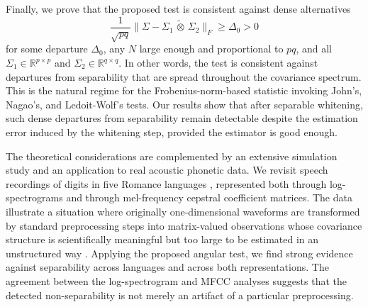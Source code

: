 \documentclass[12pt]{article}
\newcommand{\R}{\mathbb{R}}
\newcommand{\ot}{\,\tilde\otimes\,}
\begin{document}
Finally, we prove that the proposed test is consistent against dense alternatives
\[
\frac{1}{\sqrt{pq}}\| \Sigma - \Sigma_1 \ot \Sigma_2\|_F \geq \Delta_0 > 0
\]
for some departure $\Delta_0$, any $N$ large enough and proportional to $pq$, and all $\Sigma_1 \in \R^{p \times p}$ and $\Sigma_2 \in \R^{q \times q}$.
In other words, the test is consistent against departures from separability that are spread throughout the covariance spectrum. This is the natural regime for the Frobenius-norm-based statistic invoking John's, Nagao's, and Ledoit-Wolf's tests. Our results show that after separable whitening, such dense departures from separability remain detectable despite the estimation error induced by the whitening step, provided the estimator is good enough.%

The theoretical considerations are complemented by an extensive simulation study and an application to real acoustic phonetic data. We revisit speech recordings of digits in five Romance languages \citep{pigoli2014distances}, represented both through log-spectrograms and through mel-frequency cepstral coefficient matrices. The data illustrate a situation where originally one-dimensional waveforms are transformed by standard preprocessing steps into matrix-valued observations whose covariance structure is scientifically meaningful but too large to be estimated in an unstructured way \citep{pigoli2018statistical}. Applying the proposed angular test, we find strong evidence against separability across languages and across both representations. The agreement between the log-spectrogram and MFCC analyses suggests that the detected non-separability is not merely an artifact of a particular preprocessing.
\end{document}

